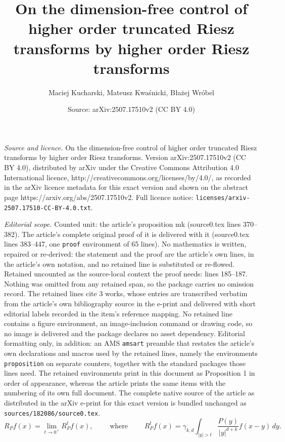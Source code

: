 \documentclass[10pt,a4paper]{amsart}
\title{On the dimension-free control of higher order truncated Riesz transforms by higher order Riesz transforms}
\author{Maciej Kucharski, Mateusz Kwaśnicki, B{\l}a{\.z}ej Wr{\'o}bel}
\date{Source: arXiv:2507.17510v2 (CC BY 4.0)}
\begin{document}
\maketitle

\noindent\emph{Source and licence.} On the dimension-free control of higher order truncated Riesz transforms by higher order Riesz transforms. Version arXiv:2507.17510v2 (CC BY 4.0), distributed by arXiv under the Creative Commons Attribution 4.0 International licence, http://creativecommons.org/licenses/by/4.0/, as recorded in the arXiv licence metadata for this exact version and shown on the abstract page https://arxiv.org/abs/2507.17510v2. Full licence notice: \texttt{licenses/arxiv-2507.17510-CC-BY-4.0.txt}.\par\smallskip

\noindent\textit{Editorial scope.} Counted unit: the article's proposition mk (source0.tex lines 370--382). The article's complete original proof of it is delivered with it (source0.tex lines 383--447, one \texttt{proof} environment of 65 lines). No mathematics is written, repaired or re-derived: the statement and the proof are the article's own lines, in the article's own notation, and no retained line is substituted or re-flowed.  Retained uncounted as the source-local context the proof needs: lines 185--187.  Nothing was omitted from any retained span, so the package carries no omission record.  The retained lines cite 3 works, whose entries are transcribed verbatim from the article's own bibliography source in the e-print and delivered with short editorial labels recorded in the item's reference mapping.  No retained line contains a figure environment, an image-inclusion command or drawing code, so no image is delivered and the package declares no asset dependency.  Editorial formatting only, in addition: an AMS \texttt{amsart} preamble that restates the article's own declarations and macros used by the retained lines, namely the environments \texttt{proposition} on separate counters, together with the standard packages those lines need.  The retained environments print in this document as Proposition 1 in order of appearance, whereas the article prints the same items with the numbering of its own full document.  The complete native source of the article as distributed in the arXiv e-print for this exact version is bundled unchanged as \texttt{sources/182086/source0.tex}.
\begin{equation} \label{eq:R}
	R_P f(x)= \lim_{t \to 0^+} R_P^t f(x), \qquad\textrm{ where } \qquad R_P^t f(x) = \gamma_{k,d} \int_{|y|>t} \frac{P(y)}{|y|^{d+k}} f(x-y) \, dy.
\end{equation}
\end{document}
